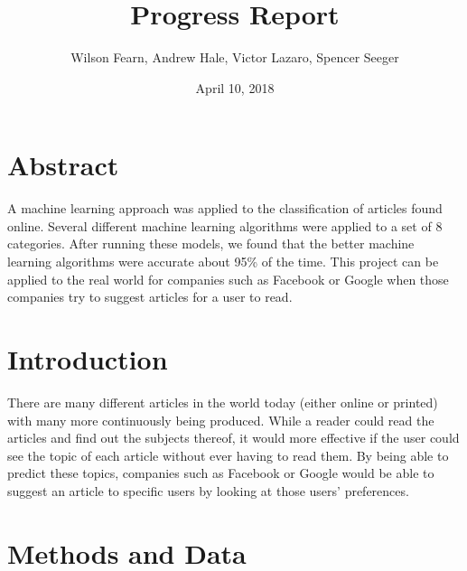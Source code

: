 \documentclass[fleqn,11pt]{article}
\begin{document}
    \lstset{
    language=Python,
    basicstyle=\small,          %
    keywordstyle=\bfseries,
    identifierstyle=,           %
    commentstyle=,              %
    stringstyle=\ttfamily,      %
    showstringspaces=false,     %
    numbers=left,
    numberstyle=\tiny,
    numbersep=5pt,
    frame=tb,
    }

    \title{Progress Report}
    \author{Wilson Fearn, Andrew Hale, Victor Lazaro, Spencer Seeger}
    \date{April 10, 2018}
    \maketitle
    \begin{multicols}{2}
    \section{Abstract}
    A machine learning approach was applied to the classification of articles found online. 
    Several different machine learning algorithms were applied to a set of 8 categories. 
    After running these models, we found that the better machine learning algorithms were 
    accurate about 95\% of the time. This project can be applied to the real world for 
    companies such as Facebook\textsuperscript{\textregistered} or 
    Google\textsuperscript{\textregistered} when those companies try to suggest articles for a 
    user to read.

    \section{Introduction}
    There are many different articles in the world today (either online or printed) with many 
    more continuously being produced. While a reader could read the articles and find out the 
    subjects thereof, it would more effective if the user could see the topic of each article 
    without ever having to read them. By being able to predict these topics, companies such 
    as Facebook\textsuperscript{\textregistered} or Google\textsuperscript{\textregistered} 
    would be able to suggest an article to specific users by looking at those users’ 
    preferences.
    
    \section{Methods and Data}

\end{multicols}
\end{document}
